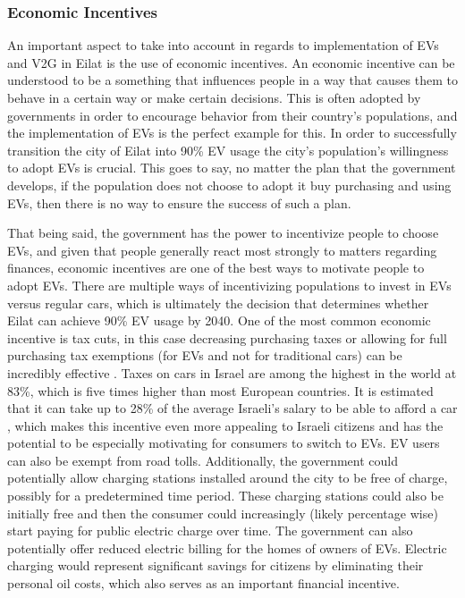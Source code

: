 \documentclass{article}                         %
\begin{document}
\subsubsection{Economic Incentives}
An important aspect to take into account in regards to implementation of EVs and V2G in Eilat is the use of economic incentives. An economic incentive can be understood to be a something that influences people in a way that causes them to behave in a certain way or make certain decisions. This is often adopted by governments in order to encourage behavior from their country’s populations, and the implementation of EVs is the perfect example for this. In order to successfully transition the city of Eilat into 90\% EV usage the city’s population’s willingness to adopt EVs is crucial. This goes to say, no matter the plan that the government develops, if the population does not choose to adopt it buy purchasing and using EVs, then there is no way to ensure the success of such a plan. 

That being said, the government has the power to incentivize people to choose EVs, and given that people generally react most strongly to matters regarding finances, economic incentives are one of the best ways to motivate people to adopt EVs. There are multiple ways of incentivizing populations to invest in EVs versus regular cars, which is ultimately the decision that determines whether Eilat can achieve 90\% EV usage by 2040. One of the most common economic incentive is tax cuts, in this case decreasing purchasing taxes or allowing for full purchasing tax exemptions (for EVs and not for traditional cars) can be incredibly effective \cite{Katsovitch2011JIMS:Highest}. Taxes on cars in Israel are among the highest in the world at 83\%, which is five times higher than most European countries. It is estimated that it can take up to 28\% of the average Israeli’s salary to be able to afford a car \cite{Katsovitch2011JIMS:Highest}, which makes this incentive even more appealing to Israeli citizens and has the potential to be especially motivating for consumers to switch to EVs. EV users can also be exempt from road tolls. Additionally, the government could potentially allow charging stations installed around the city to be free of charge, possibly for a predetermined time period. These charging stations could also be initially free and then the consumer could increasingly (likely percentage wise) start paying for public electric charge over time. The government can also potentially offer reduced electric billing for the homes of owners of EVs. Electric charging would represent significant savings for citizens by eliminating their personal oil costs, which also serves as an important financial incentive.
\end{document}
